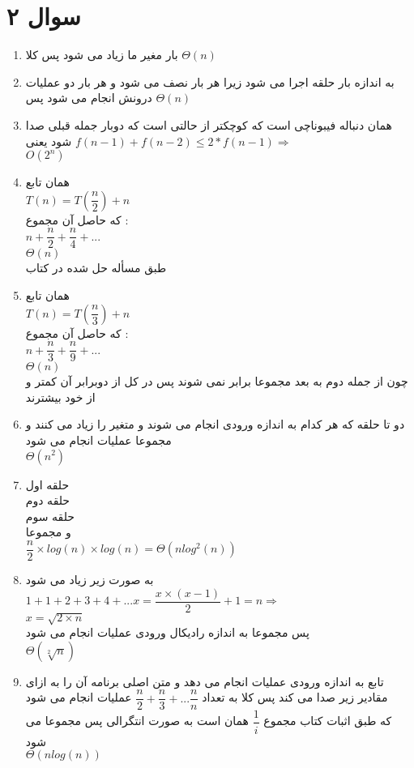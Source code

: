\documentclass[a4paper]{article}
\begin{document}
\section*{سوال ۲}
\begin{enumerate}
\item{}
بار مغیر ما زیاد می شود پس کلا
$\Theta(n)$
\item{}
به اندازه
 بار حلقه اجرا می شود زیرا هر بار نصف می شود و هر بار دو عملیات درونش انجام می شود پس
$\Theta(n)$ 

\item{}
همان دنباله فیبوناچی است که کوچکتر از حالتی است که دوبار جمله قبلی صدا شود یعنی
$f(n-1) + f(n-2) \leq 2*f(n-1) \Rightarrow$
\\
$O(2^n)$

\item{}
همان تابع
\\
$T(n) = T(\dfrac{n}{2}) + n$
\\
که حاصل آن مجموع :
\\
$n + \dfrac{n}{2} + \dfrac{n}{4} + ...$
\\
$\Theta(n)$
\\
طبق مسأله حل شده در کتاب
\item{}
همان تابع
\\
$T(n) = T(\dfrac{n}{3}) + n$
\\
که حاصل آن مجموع :
\\
$n + \dfrac{n}{3} + \dfrac{n}{9} + ...$
\\
$\Theta(n)$
\\
چون از جمله دوم به بعد مجموعا برابر
نمی شوند پس در کل از دوبرابر آن کمتر و از خود
بیشترند
\item{}
دو تا حلقه که هر کدام به اندازه ورودی انجام می شوند و متغیر را زیاد می کنند و مجموعا
عملیات انجام می شود
\\
$\Theta(n^2)$
\item{}
حلقه اول
\\حلقه دوم
\\حلقه سوم
\\و مجموعا\\
$\dfrac{n}{2} \times log(n) \times log(n) = \Theta(nlog^2(n))$

\item{}
به صورت زیر زیاد می شود
\\
$1 + 1 + 2 + 3 + 4 + ... x = \dfrac{x\times(x-1)}{2} + 1 = n \Rightarrow$
\\
$x = \sqrt{2 \times n}$
\\
پس مجموعا به اندازه رادیکال ورودی عملیات انجام می شود\\
$\Theta(\sqrt[2]{n})$

\item{}

تابع به اندازه ورودی عملیات انجام می دهد و متن اصلی برنامه آن را به ازای مقادیر زیر صدا می کند پس کلا به تعداد
$\dfrac{n}{2} + \dfrac{n}{3} + ... \dfrac{n}{n}$
عملیات انجام می شود
\\
که طبق اثبات کتاب مجموع 
$\dfrac{1}{i}$
همان 
است به صورت انتگرالی
پس مجموعا می شود
\\
$\Theta(nlog(n))$
\end{enumerate}
\end{document}
